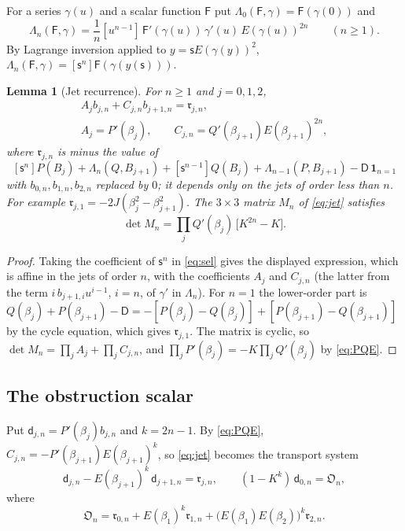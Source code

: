 \documentclass[11pt]{amsart}
\numberwithin{equation}{section}
\newtheorem{lemma}[theorem]{Lemma}
\theoremstyle{definition}
\theoremstyle{remark}
\newcommand{\Obs}{\mathfrak{O}}
\newcommand{\sD}{\mathsf D}
\newcommand{\ssf}{\mathsf s}
\begin{document}
For a series $\gamma(u)$ and a scalar function $\mathsf F$ put $\Lambda_0(\mathsf F,\gamma)=\mathsf F(\gamma(0))$ and
\[
\Lambda_n(\mathsf F,\gamma)=\frac1n[u^{n-1}]\,\mathsf F'(\gamma(u))\,\gamma'(u)\,E(\gamma(u))^{2n}\qquad(n\ge1).
\]
By Lagrange inversion applied to $y=\ssf E(\gamma(y))^2$, $\Lambda_n(\mathsf F,\gamma)=[\ssf^n]\mathsf F(\gamma(y(\ssf)))$.

\begin{lemma}[Jet recurrence]\label{lem:jets}
For $n\ge1$ and $j=0,1,2$,
\begin{equation}\label{eq:jet}
\begin{gathered}
A_jb_{j,n}+C_{j,n}b_{j+1,n}=\mathfrak r_{j,n},\\
A_j=P'(\beta_j),\qquad C_{j,n}=Q'(\beta_{j+1})E(\beta_{j+1})^{2n},
\end{gathered}
\end{equation}
where $\mathfrak r_{j,n}$ is minus the value of
\[
[\ssf^n]P(B_j)+\Lambda_n(Q,B_{j+1})+[\ssf^{n-1}]Q(B_j)+\Lambda_{n-1}(P,B_{j+1})-\sD\,\mathbf 1_{n=1}
\]
with $b_{0,n},b_{1,n},b_{2,n}$ replaced by $0$; it depends only on the jets of order less than $n$. For example $\mathfrak r_{j,1}=-2J(\beta_j^2-\beta_{j+1}^2)$. The $3\times3$ matrix $M_n$ of \eqref{eq:jet} satisfies
\begin{equation}\label{eq:det}
\det M_n=\prod_jQ'(\beta_j)\,\bigl[K^{2n}-K\bigr].
\end{equation}
\end{lemma}

\begin{proof}
Taking the coefficient of $\ssf^n$ in \eqref{eq:sel} gives the displayed expression, which is affine in the jets of order $n$, with the coefficients $A_j$ and $C_{j,n}$ (the latter from the term $i\,b_{j+1,i}u^{i-1}$, $i=n$, of $\gamma'$ in $\Lambda_n$). For $n=1$ the lower-order part is $Q(\beta_j)+P(\beta_{j+1})-\sD=-[P(\beta_j)-Q(\beta_j)]+[P(\beta_{j+1})-Q(\beta_{j+1})]$ by the cycle equation, which gives $\mathfrak r_{j,1}$. The matrix is cyclic, so $\det M_n=\prod_jA_j+\prod_jC_{j,n}$, and $\prod_jP'(\beta_j)=-K\prod_jQ'(\beta_j)$ by \eqref{eq:PQE}.
\end{proof}

\subsection{The obstruction scalar}
Put $\mathsf d_{j,n}=P'(\beta_j)b_{j,n}$ and $k=2n-1$. By \eqref{eq:PQE}, $C_{j,n}=-P'(\beta_{j+1})E(\beta_{j+1})^{k}$, so \eqref{eq:jet} becomes the transport system
\begin{equation}\label{eq:transport}
\mathsf d_{j,n}-E(\beta_{j+1})^k\,\mathsf d_{j+1,n}=\mathfrak r_{j,n},\qquad (1-K^k)\,\mathsf d_{0,n}=\Obs_n,
\end{equation}
where
\begin{equation}\label{eq:obs}
\Obs_n=\mathfrak r_{0,n}+E(\beta_1)^k\mathfrak r_{1,n}+\bigl(E(\beta_1)E(\beta_2)\bigr)^k\mathfrak r_{2,n}.
\end{equation}
\end{document}
